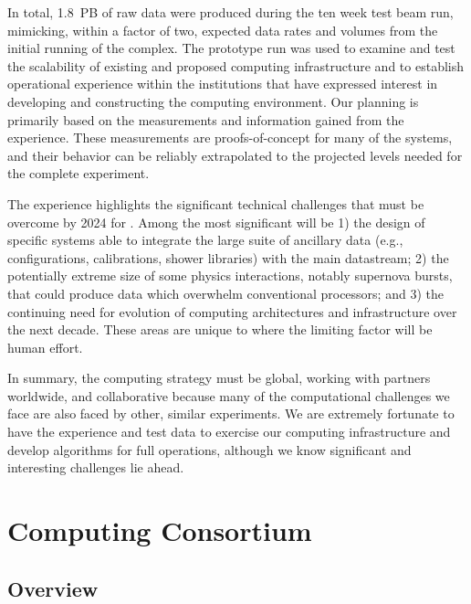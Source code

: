 In total, \SI{1.8}{PB} of raw data were produced during the ten week test beam run, mimicking, within a factor of two, expected data rates and volumes from the initial running of the  complex.  The prototype run was used to examine and test the scalability of existing and proposed computing infrastructure and to establish operational experience within the institutions that have expressed interest in developing and constructing the  computing environment.  Our planning is primarily based on the measurements and information gained from the  experience.  These measurements are proofs-of-concept for many of the systems, and their behavior can be reliably extrapolated to the projected levels needed for the complete  experiment. 

The  experience highlights the significant technical challenges that must be overcome by 2024 for . Among the most significant will be  1) the design of  specific systems able to integrate the large suite of ancillary data (e.g., configurations, calibrations, shower libraries) with the main  datastream; 2) the potentially extreme size of some physics interactions, notably supernova bursts, that could produce data which overwhelm conventional processors; and 3) the continuing need for evolution of computing architectures and infrastructure over the next decade. These areas are unique to  where the limiting factor will be human effort. 

In summary, the  computing strategy must be global, working with partners worldwide, and collaborative because many of the computational challenges we face are also %
faced by other, similar experiments.  We are extremely fortunate to have the  experience and test data to exercise our computing infrastructure and develop algorithms for full  operations, although we know significant and interesting challenges lie ahead. 
 
\section{Computing Consortium}
\subsection{Overview}
\label{ch:exec-comp-ovr}

